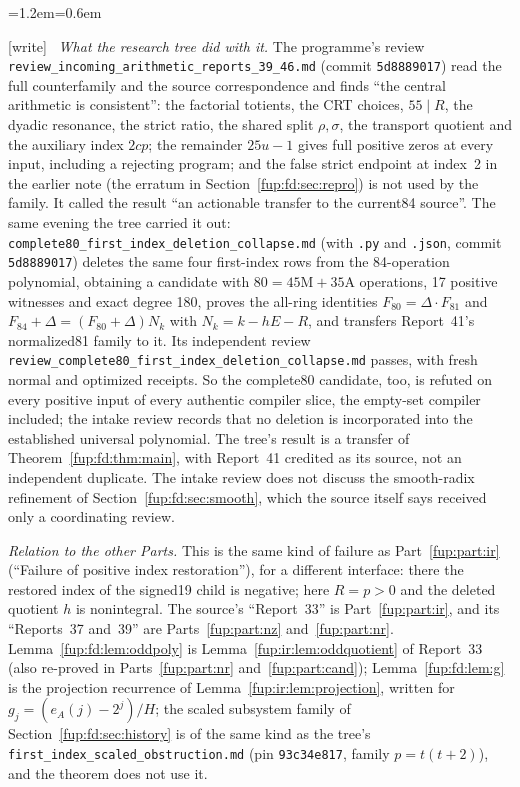 \documentclass[11pt,letterpaper]{article}
\theoremstyle{definition}\newtheorem{definition}[theorem]{Definition}
\theoremstyle{remark}\newtheorem{remark}[theorem]{Remark}
\newcommand{\ea}{e_A}
\newcommand{\wtag}{\textup{[write]}}
\newenvironment{writenote}{\par\smallskip\begin{list}{}{\leftmargin=1.2em\rightmargin=0.6em}\item[]\small\wtag\ }{\end{list}\smallskip}
\newcommand{\rw}[1]{\nolinkurl{#1}}%
\begin{document}
\begin{writenote}
\emph{What the research tree did with it.} The programme's review \rw{review_incoming_arithmetic_reports_39_46.md} (commit \texttt{5d8889017}) read the full counterfamily and the source correspondence and finds ``the central arithmetic is consistent'': the factorial totients, the CRT choices, $55\mid R$, the dyadic resonance, the strict ratio, the shared split $\rho,\sigma$, the transport quotient and the auxiliary index $2cp$; the remainder $25u-1$ gives full positive zeros at every input, including a rejecting program; and the false strict endpoint at index~2 in the earlier note (the erratum in Section~\ref{fup:fd:sec:repro}) is not used by the family. It called the result ``an actionable transfer to the current84 source''. The same evening the tree carried it out: \rw{complete80_first_index_deletion_collapse.md} (with \rw{.py} and \rw{.json}, commit \texttt{5d8889017}) deletes the same four first-index rows from the 84-operation polynomial, obtaining a candidate with $80=45\mathrm M+35\mathrm A$ operations, 17 positive witnesses and exact degree 180, proves the all-ring identities $F_{80}=\Delta\cdot F_{81}$ and $F_{84}+\Delta=(F_{80}+\Delta)N_k$ with $N_k=k-hE-R$, and transfers Report~41's normalized81 family to it. Its independent review \rw{review_complete80_first_index_deletion_collapse.md} passes, with fresh normal and optimized receipts. So the complete80 candidate, too, is refuted on every positive input of every authentic compiler slice, the empty-set compiler included; the intake review records that no deletion is incorporated into the established universal polynomial. The tree's result is a transfer of Theorem~\ref{fup:fd:thm:main}, with Report~41 credited as its source, not an independent duplicate. The intake review does not discuss the smooth-radix refinement of Section~\ref{fup:fd:sec:smooth}, which the source itself says received only a coordinating review.

\emph{Relation to the other Parts.} This is the same kind of failure as Part~\ref{fup:part:ir} (``Failure of positive index restoration''), for a different interface: there the restored index of the signed19 child is negative; here $R=p>0$ and the deleted quotient $h$ is nonintegral. The source's ``Report~33'' is Part~\ref{fup:part:ir}, and its ``Reports~37 and~39'' are Parts~\ref{fup:part:nz} and~\ref{fup:part:nr}. Lemma~\ref{fup:fd:lem:oddpoly} is Lemma~\ref{fup:ir:lem:oddquotient} of Report~33 (also re-proved in Parts~\ref{fup:part:nr} and~\ref{fup:part:cand}); Lemma~\ref{fup:fd:lem:g} is the projection recurrence of Lemma~\ref{fup:ir:lem:projection}, written for $g_j=(\ea(j)-2^j)/H$; the scaled subsystem family of Section~\ref{fup:fd:sec:history} is of the same kind as the tree's \rw{first_index_scaled_obstruction.md} (pin \texttt{93c34e817}, family $p=t(t+2)$), and the theorem does not use it.


\end{writenote}
\end{document}
